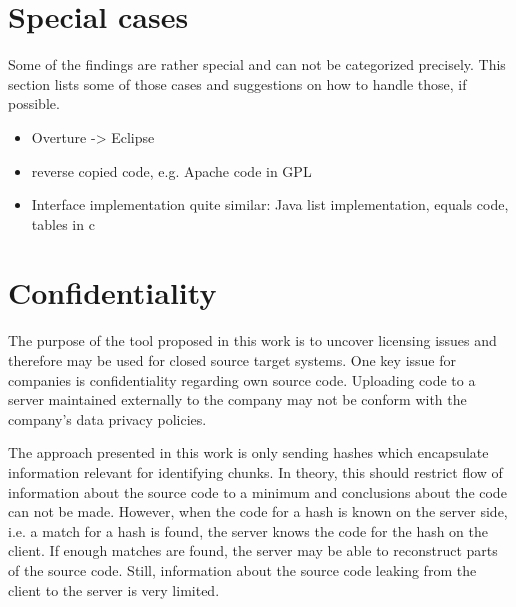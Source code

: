 
\section{Special cases}
Some of the findings are rather special and can not be categorized precisely.
This section lists some of those cases and suggestions on how to handle those, if possible.

\begin{itemize}
	\item Overture -> Eclipse
	\item reverse copied code, e.g. Apache code in GPL
	\item Interface implementation quite similar: Java list implementation, equals code, tables in c
\end{itemize}


\section{Confidentiality}
The purpose of the tool proposed in this work is to uncover licensing issues and therefore may be used for closed source target systems.
One key issue for companies is confidentiality regarding own source code.
Uploading code to a server maintained externally to the company may not be conform with the company's data privacy policies.

The approach presented in this work is only sending hashes which encapsulate information relevant for identifying chunks.
In theory, this should restrict flow of information about the source code to a minimum and conclusions about the code can not be made.
However, when the code for a hash is known on the server side, i.e. a match for a hash is found, the server knows the code for the hash on the client.
If enough matches are found, the server may be able to reconstruct parts of the source code.
Still, information about the source code leaking from the client to the server is very limited.
